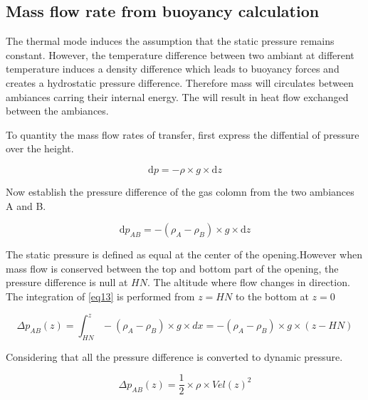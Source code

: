 \documentclass[a4paper, english]{article}
\begin{document}
        \subsection{Mass flow rate from buoyancy calculation}
        
        
            The thermal mode induces the assumption that the static pressure remains constant. However, the temperature difference between two ambiant at different temperature induces a density difference which leads to buoyancy forces and creates a hydrostatic pressure difference. Therefore mass will circulates between ambiances carring their internal energy. The will result in heat flow exchanged between the ambiances.
            
            To quantity the mass flow rates of transfer, first express the diffential of pressure over the height.

            \begin{equation}
                \label{eq12}
                \mathrm{d}p = -\rho \times g \times \mathrm{d} z
            \end{equation}
            
            Now establish the pressure difference of the gas colomn from the two ambiances A and B.
            
            \begin{equation}
                \label{eq13}
                \mathrm{d}p_{AB} = -(\rho_A - \rho_B) \times g \times \mathrm{d} z
            \end{equation}       
            
            
            The static pressure is defined as equal at the center of the opening.However when mass flow is conserved between the top and bottom part of the opening, the pressure difference is null at $ HN $. The altitude where flow changes in direction. The integration of \eqref{eq13} is performed from $ z = HN $ to the bottom at $ z = 0 $

            
            \begin{equation}
                \label{eq14}
                \Delta p_{AB}(z) = \int_{HN}^{z} -(\rho_A - \rho_B) \times g \times dx = -(\rho_A - \rho_B) \times g \times (z - HN)
            \end{equation} 
            
            Considering that all the pressure difference is converted to dynamic pressure.
            
            \begin{equation}
                \label{eq15}
                \Delta p_{AB}(z) = \frac{1}{2} \times \rho \times Vel(z)^2
            \end{equation}
            
\end{document}
